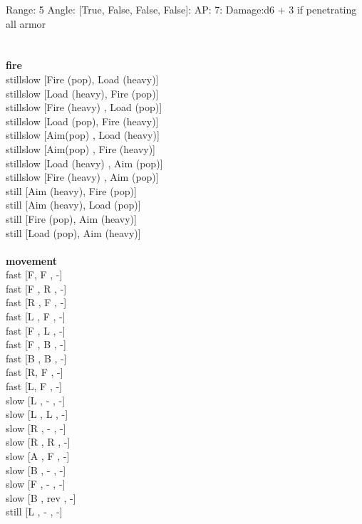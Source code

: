 Range: 5  Angle: [True, False, False, False]: AP: 7: Damage:d6 + 3 if penetrating all armor \\




 
\ \\




\ \\ {\bf fire } \\
stillslow [Fire (pop), Load (heavy)] \\
stillslow [Load (heavy), Fire (pop)] \\
stillslow [Fire (heavy) ,  Load (pop)] \\
stillslow [Load (pop), Fire (heavy)] \\
stillslow [Aim(pop) ,  Load (heavy)] \\
stillslow [Aim(pop) ,  Fire (heavy)] \\
stillslow [Load (heavy) ,  Aim (pop)] \\
stillslow [Fire (heavy) ,  Aim (pop)] \\
still [Aim (heavy), Fire (pop)] \\
still [Aim (heavy), Load (pop)] \\
still [Fire (pop), Aim (heavy)] \\
still [Load (pop), Aim (heavy)] \\
\ \\ {\bf movement } \\
fast [F,  F ,  -] \\
fast [F ,  R ,  -] \\
fast [R ,  F ,  -] \\
fast [L ,  F ,  -] \\
fast [F ,  L ,  -] \\
fast [F ,  B ,  -] \\
fast [B ,  B ,  -] \\
fast [R,  F ,  -] \\
fast [L,  F ,  -] \\
slow [L ,  - ,  -] \\
slow [L ,  L ,  -] \\
slow [R ,  - ,  -] \\
slow [R ,  R ,  -] \\
slow [A ,  F ,  -] \\
slow [B ,  - ,  -] \\
slow [F ,  - ,  -] \\
slow [B ,  rev ,  -] \\
still [L ,  - ,  -] \\

